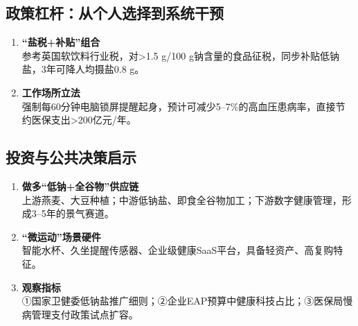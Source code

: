 \subsection{政策杠杆：从个人选择到系统干预}
\begin{enumerate}[leftmargin=*, nosep]
    \item \textbf{“盐税+补贴”组合 } \\
    参考英国软饮料行业税，对>1.5 g/100 g钠含量的食品征税，同步补贴低钠盐，3年可降人均摄盐0.8 g。
    \item \textbf{工作场所立法 } \\
    强制每60分钟电脑锁屏提醒起身，预计可减少5–7\%的高血压患病率，直接节约医保支出>200亿元/年。
\end{enumerate}

\subsection{投资与公共决策启示}
\begin{enumerate}[leftmargin=*, nosep]
    \item \textbf{做多“低钠+全谷物”供应链}  \\
    上游燕麦、大豆种植；中游低钠盐、即食全谷物加工；下游数字健康管理，形成3–5年的景气赛道。
    \item \textbf{“微运动”场景硬件  }\\
    智能水杯、久坐提醒传感器、企业级健康SaaS平台，具备轻资产、高复购特征。
    \item \textbf{观察指标}  \\
    ①国家卫健委低钠盐推广细则；②企业EAP预算中健康科技占比；③医保局慢病管理支付政策试点扩容。
\end{enumerate}